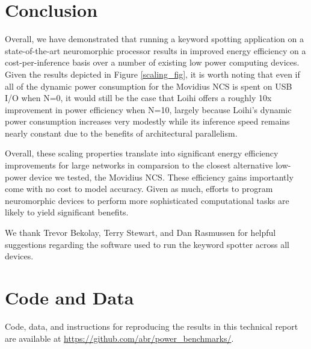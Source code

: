 \documentclass[sigconf, screen]{acmart}
\begin{document}
\section{Conclusion}

Overall, we have demonstrated that running a keyword spotting application on a state-of-the-art neuromorphic processor results in improved energy efficiency on a cost-per-inference basis over a number of existing low power computing devices. Given the results depicted in Figure \ref{scaling_fig}, it is worth noting that even if all of the dynamic power consumption for the Movidius NCS is spent on USB I/O when N=0, it would still be the case that Loihi offers a roughly 10x improvement in power efficiency when N=10, largely because Loihi's dynamic power consumption increases very modestly while its inference speed remains nearly constant due to the benefits of architectural parallelism. 

Overall, these scaling properties translate into significant energy efficiency improvements for large networks in comparsion to the closest alternative low-power device we tested, the Movidius NCS. These efficiency gains importantly come with no cost to model accuracy. Given as much, efforts to program neuromorphic devices to perform more sophisticated computational tasks are likely to yield significant benefits. 


\begin{acks}
We thank Trevor Bekolay, Terry Stewart, and Dan Rasmussen for helpful suggestions regarding the software used to run the keyword spotter across all devices.
\end{acks}

\section*{Code and Data} 
 
Code, data, and instructions for reproducing the results in this technical report are available at \url{https://github.com/abr/power\_benchmarks/}.
%


\end{document}
